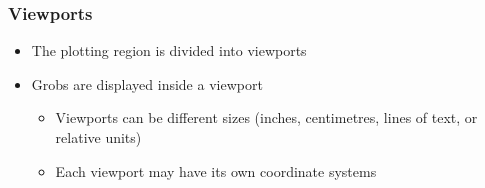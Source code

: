 \documentclass[xcolor=svgnames]{beamer}
\begin{document}
\begin{frame}
  \frametitle{Viewports}

  \begin{itemize}
  \item The plotting region is divided into viewports
  \item Grobs are displayed inside a viewport
        \begin{itemize}
        \item Viewports can be different sizes (inches, centimetres,
        lines of text, or relative units)
        \item Each viewport may have its own coordinate systems
        \end{itemize}
  \end{itemize}

\end{frame}
\end{document}
